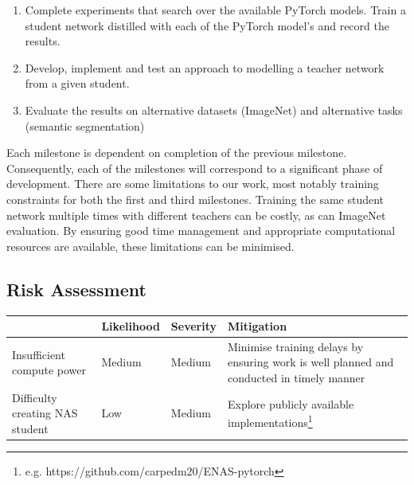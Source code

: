 \documentclass[a4paper,11pt]{article}
\begin{document}
\begin{enumerate}
    \item Complete experiments that search over the available PyTorch models. Train a student network distilled with each of the PyTorch model's and record the results.
    \item Develop, implement and test an approach to modelling a teacher network from a given student.
    \item Evaluate the results on alternative datasets (ImageNet) and alternative tasks (semantic segmentation)
\end{enumerate}

Each milestone is dependent on completion of the previous milestone. Consequently, each of the milestones will correspond to a significant phase of development. There are some limitations to our work, most notably training constraints for both the first and third milestones. Training the same student network multiple times with different teachers can be costly, as can ImageNet evaluation. By ensuring good time management and appropriate computational resources are available, these limitations can be minimised.


\subsection{Risk Assessment}
\begin{table}[ht]
\centering
\begin{tabular}{p{3cm}|p{2cm}p{1.5cm}p{4cm}}
 & \textbf{Likelihood} & \textbf{Severity} & \textbf{Mitigation}\\ \hline
Insufficient compute power & Medium & Medium & Minimise training delays by ensuring work is well planned and conducted in timely manner\\
Difficulty creating NAS student & Low & Medium & Explore publicly available implementations\footnote{e.g.  https://github.com/carpedm20/ENAS-pytorch}\\
\end{tabular}
\end{table}
\end{document}
